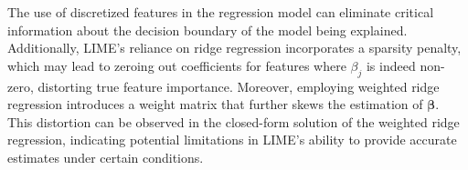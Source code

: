 \documentclass[mnsc,blindrev]{informs3}
\begin{document}
             The use of discretized features in the regression model can eliminate critical information about the decision boundary of the model being explained. Additionally, LIME's reliance on ridge regression incorporates a sparsity penalty, which may lead to zeroing out coefficients for features where $\beta_j$  is indeed non-zero, distorting true feature importance. Moreover, employing weighted ridge regression introduces a weight matrix that further skews the estimation of $\boldsymbol{\beta}$. This distortion can be observed in the closed-form solution of the weighted ridge regression, indicating potential limitations in LIME's ability to provide accurate estimates under certain conditions.
\end{document}
